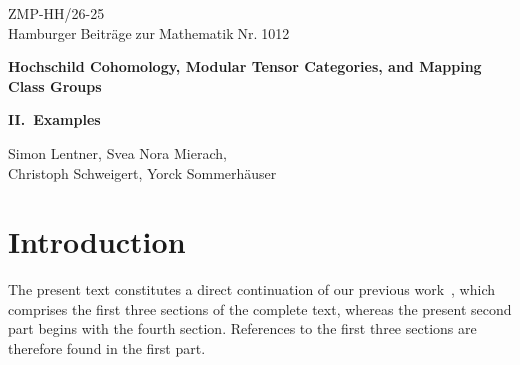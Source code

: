 \documentclass[12pt]{article}
\theoremstyle{definition}
\theoremstyle{break}
\renewcommand{\1}{\mathbbm{1}}
\begin{document}
\begin{flushright}
{\sf ZMP-HH/26-25}\\
{\sf Hamburger$\;$Beitr\"age$\;$zur$\;$Mathematik$\;$Nr.$\;$1012}
\end{flushright}
\vskip 11mm


\begin{center}{\bf \Large 
Hochschild Cohomology, Modular Tensor Categories, and Mapping Class Groups}


\large{\bf II.~Examples}

\vskip 8mm

{\large Simon Lentner, Svea Nora Mierach,\\ \vskip 1mm Christoph Schweigert, Yorck Sommerh\"auser}
\vskip 9mm
\end{center}

\vspace{15mm}

\begin{abstract}
\noindent In the first part of this work, we have, for a not necessarily semisimple modular category, generalized the action of the mapping class groups of surfaces on the spaces of conformal blocks to the so-called derived block spaces. In the second part presented here, we compute this action explicitly in the case of Drinfel'd doubles of finite groups over fields of positive characteristic. To do that, we connect Lyubashenko's approach to mapping class group representations with the theory of representation varieties. In this way, we are able to show that the mapping class group representations on the derived block spaces are in general different from those on the ordinary block spaces.
\end{abstract}


\setcounter{tocdepth}{2}

\newpage

\tableofcontents

\newpage 

\section*{Introduction}

The present text constitutes a direct continuation of our previous work~\cite{LMSS2}, which comprises the first three sections of the complete text, whereas the present second part begins with the fourth section. References to the first three sections are therefore found in the first part.
\end{document}

